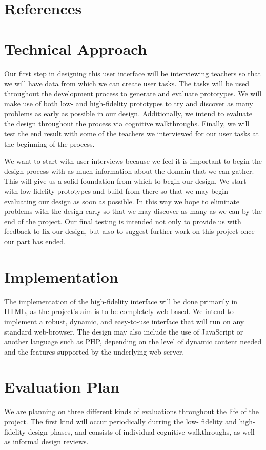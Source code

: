 \documentclass[11pt,letter]{article}
\begin{document}
\section{References}

\section{Technical Approach}
Our first step in designing this user interface will be interviewing teachers so
that we will have data from which we can create user tasks. The tasks will be
used throughout the development process to generate and evaluate prototypes. We
will make use of both low- and high-fidelity prototypes to try and discover as
many problems as early as possible in our design. Additionally, we intend to
evaluate the design throughout the process via cognitive walkthroughs. Finally,
we will test the end result with some of the teachers we interviewed for our
user tasks at the beginning of the process.

We want to start with user interviews because we feel it is important to begin
the design process with as much information about the domain that we can gather.
This will give us a solid foundation from which to begin our design. We start
with low-fidelity prototypes and build from there so that we may begin
evaluating our design as soon as possible. In this way we hope to eliminate
problems with the design early so that we may discover as many as we can by the
end of the project. Our final testing is intended not only to provide us with
feedback to fix our design, but also to suggest further work on this project
once our part has ended.

\section{Implementation}
The implementation of the high-fidelity interface will be done primarily in
HTML, as the project's aim is to be completely web-based.  We intend to
implement a robust, dynamic, and easy-to-use interface that will run on any
standard web-browser.  The design may also include the use of JavaScript or
another language such as PHP, depending on the level of dynamic content needed
and the features supported by the underlying web server.

\section{Evaluation Plan}
We are planning on three different kinds of evaluations throughout the life
of the project.  The first kind will occur periodically durring the low-%
fidelity and high-fidelity design phases, and consists of individual
cognitive walkthroughs, as well as informal design reviews.
\end{document}
